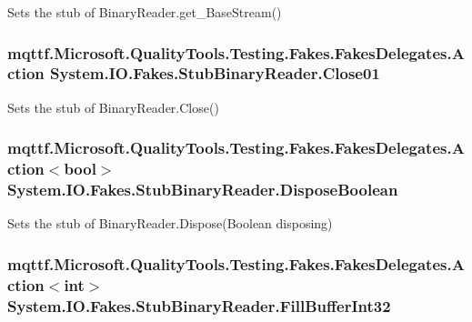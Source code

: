 Sets the stub of Binary\-Reader.\-get\-\_\-\-Base\-Stream()

\hypertarget{class_system_1_1_i_o_1_1_fakes_1_1_stub_binary_reader_aadf04019d4acb612d2b1a8142c4ffa5a}{
\subsubsection[{Close01}]{\setlength{\rightskip}{0pt plus 5cm}mqttf.\-Microsoft.\-Quality\-Tools.\-Testing.\-Fakes.\-Fakes\-Delegates.\-Action System.\-I\-O.\-Fakes.\-Stub\-Binary\-Reader.\-Close01}}\label{class_system_1_1_i_o_1_1_fakes_1_1_stub_binary_reader_aadf04019d4acb612d2b1a8142c4ffa5a}


Sets the stub of Binary\-Reader.\-Close()

\hypertarget{class_system_1_1_i_o_1_1_fakes_1_1_stub_binary_reader_afc99be4545dc063862a866310f85a972}{
\subsubsection[{Dispose\-Boolean}]{\setlength{\rightskip}{0pt plus 5cm}mqttf.\-Microsoft.\-Quality\-Tools.\-Testing.\-Fakes.\-Fakes\-Delegates.\-Action$<$bool$>$ System.\-I\-O.\-Fakes.\-Stub\-Binary\-Reader.\-Dispose\-Boolean}}\label{class_system_1_1_i_o_1_1_fakes_1_1_stub_binary_reader_afc99be4545dc063862a866310f85a972}


Sets the stub of Binary\-Reader.\-Dispose(\-Boolean disposing)

\hypertarget{class_system_1_1_i_o_1_1_fakes_1_1_stub_binary_reader_a7e4fe0bf6bd23adf132e8fedb365d9dc}{
\subsubsection[{Fill\-Buffer\-Int32}]{\setlength{\rightskip}{0pt plus 5cm}mqttf.\-Microsoft.\-Quality\-Tools.\-Testing.\-Fakes.\-Fakes\-Delegates.\-Action$<$int$>$ System.\-I\-O.\-Fakes.\-Stub\-Binary\-Reader.\-Fill\-Buffer\-Int32}}\label{class_system_1_1_i_o_1_1_fakes_1_1_stub_binary_reader_a7e4fe0bf6bd23adf132e8fedb365d9dc}


